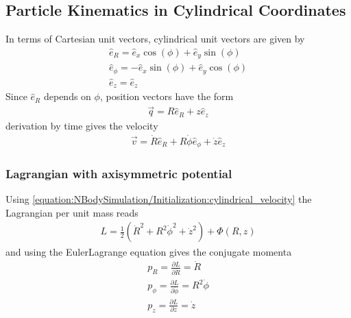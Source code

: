 \documentclass[letterpaper,10pt,english]{sphinxmanual}
\begin{document}
\subsection{Particle Kinematics in Cylindrical Coordinates}
\label{\detokenize{NBodySimulation/Initialization:particle-kinematics-in-cylindrical-coordinates}}
\sphinxAtStartPar
In terms of Cartesian unit vectors, cylindrical unit vectors are given by
\begin{equation*}
\begin{split}\hat{e}_R = \hat{e}_x\cos(\phi) + \hat{e}_y\sin(\phi) \\
\hat{e}_\phi = -\hat{e}_x\sin(\phi) + \hat{e}_y\cos(\phi)\\
\hat{e}_z = \hat{e}_z\end{split}
\end{equation*}
\sphinxAtStartPar
Since \(\hat{e}_R\) depends on \(\phi\), position vectors have the form
\begin{equation*}
\begin{split}\vec{q} = R\hat{e}_R+z\hat{e}_z\end{split}
\end{equation*}
\sphinxAtStartPar
derivation by time gives the velocity
\begin{equation}\label{equation:NBodySimulation/Initialization:cylindrical_velocity}
\begin{split}\vec{v} = \dot{R}\hat{e}_R+R\dot{\phi}\hat{e}_\phi+\dot{z}\hat{e}_z\end{split}
\end{equation}

\subsubsection{Lagrangian with axisymmetric potential}
\label{\detokenize{NBodySimulation/Initialization:lagrangian-with-axisymmetric-potential}}
\sphinxAtStartPar
Using \eqref{equation:NBodySimulation/Initialization:cylindrical_velocity} the Lagrangian per unit mass reads
\begin{equation*}
\begin{split}L =\frac{1}{2}\left( \dot{R}^2+R^2\dot{\phi}^2+\dot{z}^2 \right)+\Phi\left(R,z\right)\end{split}
\end{equation*}
\sphinxAtStartPar
and using the Euler\textendash{}Lagrange equation gives the conjugate momenta
\begin{equation}\label{equation:NBodySimulation/Initialization:conjugate_momenta}
\begin{split}p_{R} = \frac{\partial L}{\partial \dot{R}} = \dot{R} \\
 p_{\phi} = \frac{\partial L}{\partial \dot{\phi}} = R^2\dot{\phi} \\
 p_{z} = \frac{\partial L}{\partial \dot{z}} = \dot{z} \\\end{split}
\end{equation}
\end{document}
